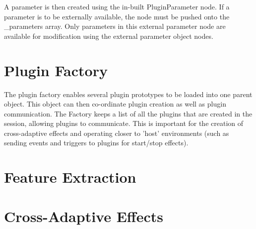 \documentclass{article}
\begin{document}
A parameter is then created using the in-built PluginParameter node. If a parameter is to be externally available, the node must be pushed onto the \_parameters array. Only parameters in this external parameter node are available for modification using the external parameter object nodes.

\section{Plugin Factory}

The plugin factory enables several plugin prototypes to be loaded into one parent object. This object can then co-ordinate plugin creation as well as plugin communication. The Factory keeps a list of all the plugins that are created in the session, allowing plugins to communicate. This is important for the creation of cross-adaptive effects and operating closer to 'host' environments (such as sending events and triggers to plugins for start/stop effects).


\section{Feature Extraction}

\section{Cross-Adaptive Effects}
\end{document}

